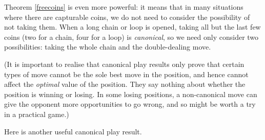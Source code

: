 \documentclass[a4paper,twocolumn]{article}
\begin{document}
Theorem \ref{freecoins} is even more powerful: it means that in many
situations where there are capturable coins, we do not need to
consider the possibility of not taking them. When a long chain or loop
is opened, taking all but the last few coins (two for a chain, four
for a loop) is \emph{canonical}, so we need only consider two
possibilities: taking the whole chain and the double-dealing move.

(It is important to realise that canonical play results only prove
that certain types of move cannot be the sole best move in the
position, and hence cannot affect the \emph{optimal} value of the
position. They say nothing about whether the position is winning or
losing. In some losing positions, a non-canonical move can give the
opponent more opportunities to go wrong, and so might be worth a try
in a practical game.)

Here is another useful canonical play result.
\end{document}
